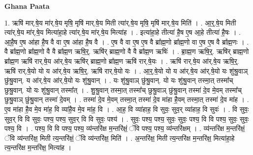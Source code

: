 \documentclass[17pt]{extarticle}
\begin{document}
\textbf{Ghana Paata } \newline

1. ऋषि॑ मार्.षे॒य मा॑र्.षे॒य मृषि॒ मृषि॑ मार्.षे॒य मिती त्या॑र्.षे॒य मृषि॒ मृषि॑ मार्.षे॒य मिति॑ । . आ॒र्॒.षे॒य मिती त्या॑र्.षे॒य मा॑र्.षे॒य मित्या॑हा॒हे त्या॑र्.षे॒य मा॑र्.षे॒य मित्या॑ह । . इत्या॑हा॒हे तीत्या॑ है॒ष ए॒ष आ॒हे तीत्या॑ है॒षः । . आ॒है॒ष ए॒ष आ॑हा है॒ष वै वा ए॒ष आ॑हा है॒ष वै । . ए॒ष वै वा ए॒ष ए॒ष वै ब्रा᳚ह्म॒णो ब्रा᳚ह्म॒णो वा ए॒ष ए॒ष वै ब्रा᳚ह्म॒णः । . वै ब्रा᳚ह्म॒णो ब्रा᳚ह्म॒णो वै वै ब्रा᳚ह्म॒ण ऋषि॒र्॒. ऋषि॑र् ब्राह्म॒णो वै वै ब्रा᳚ह्म॒ण ऋषिः॑ । . ब्रा॒ह्म॒ण ऋषि॒र्॒. ऋषि॑र् ब्राह्म॒णो ब्रा᳚ह्म॒ण ऋषि॑ रार्.षे॒य आ॑र्.षे॒य ऋषि॑र् ब्राह्म॒णो ब्रा᳚ह्म॒ण ऋषि॑ रार्.षे॒यः । . ऋषि॑ रार्.षे॒य आ॑र्.षे॒य ऋषि॒र्॒. ऋषि॑ रार्.षे॒यो यो य आ॑र्.षे॒य ऋषि॒र्॒. ऋषि॑ रार्.षे॒यो यः । . आ॒र्॒.षे॒यो यो य आ॑र्.षे॒य आ॑र्.षे॒यो यः शु॑श्रु॒वाञ् छु॑श्रु॒वान्. य आ॑र्.षे॒य आ॑र्.षे॒यो यः शु॑श्रु॒वान् । . यः शु॑श्रु॒वाञ् छु॑श्रु॒वान्. यो यः शु॑श्रु॒वान् तस्मा॒त् तस्मा᳚च् छुश्रु॒वान्. यो यः शु॑श्रु॒वान् तस्मा᳚त् । . शु॒श्रु॒वान् तस्मा॒त् तस्मा᳚च् छुश्रु॒वाञ् छु॑श्रु॒वान् तस्मा॑ दे॒व मे॒वम् तस्मा᳚च् छुश्रु॒वाञ् छु॑श्रु॒वान् तस्मा॑ दे॒वम् । . तस्मा॑ दे॒व मे॒वम् तस्मा॒त् तस्मा॑ दे॒व मा॑हा है॒वम् तस्मा॒त् तस्मा॑ दे॒व मा॑ह । . ए॒व मा॑हा है॒व मे॒व मा॑ह॒ वि व्या॑है॒व मे॒व मा॑ह॒ वि । . आ॒ह॒ वि व्या॑हाह॒ वि सुवः॒ सुव॒र् व्या॑हाह॒ वि सुवः॑ । . वि सुवः॒ सुव॒र् वि वि सुवः॒ पश्य॒ पश्य॒ सुव॒र् वि वि सुवः॒ पश्य॑ । . सुवः॒ पश्य॒ पश्य॒ सुवः॒ सुवः॒ पश्य॒ वि वि पश्य॒ सुवः॒ सुवः॒ पश्य॒ वि । . पश्य॒ वि वि पश्य॒ पश्य॒ व्य॑न्तरि॑क्ष म॒न्तरि॑क्षं॒ ॅवि पश्य॒ पश्य॒ व्य॑न्तरि॑क्षम् । . व्य॑न्तरि॑क्ष म॒न्तरि॑क्षं॒ ॅवि व्य॑न्तरि॑क्ष॒ मिती त्य॒न्तरि॑क्षं॒ ॅवि व्य॑न्तरि॑क्ष॒ मिति॑ । . अ॒न्तरि॑क्ष॒ मिती त्य॒न्तरि॑क्ष म॒न्तरि॑क्ष॒ मित्या॑हा॒हे त्य॒न्तरि॑क्ष म॒न्तरि॑क्ष॒ मित्या॑ह । \newline
\end{document}
